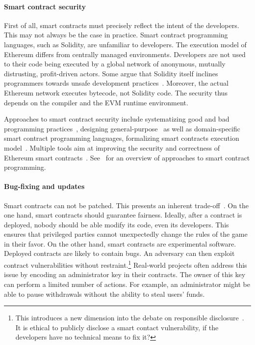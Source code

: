 \paragraph{Smart contract security}
First of all, smart contracts must precisely reflect the intent of the developers.
This may not always be the case in practice.
Smart contract programming languages, such as Solidity, are unfamiliar to developers.
The execution model of Ethereum differs from centrally managed environments.
Developers are not used to their code being executed by a global network of anonymous, mutually distrusting, profit-driven actors.
Some argue that Solidity itself inclines programmers towards unsafe development practices~\cite{ydtm2016}.
Moreover, the actual Ethereum network executes bytecode, not Solidity code.
The security thus depends on the compiler and the EVM runtime environment.

Approaches to smart contract security include systematizing good and bad programming practices~\cite{ConsenSys16, Chen2017}, designing general-purpose~\cite{Hirai2017a, Buterin2017b, Pettersson2016} as well as domain-specific~\cite{EgelundMueller2017} smart contract programming languages, formalizing smart contracts execution model~\cite{Sergey2017}.
Multiple tools aim at improving the security and correctness of Ethereum smart contracts~\cite{Bhargavan2016, Luu2016, Hirai2017, Hildenbrandt2018, Tsankov2018, Jiang2018, Slither, Manticore, Mythril, Echidna}.
See~\cite{Seijas2016} for an overview of approaches to smart contract programming.

\paragraph{Bug-fixing and updates}
Smart contracts can not be patched.
This presents an inherent trade-off~\cite{Porru2017}.
On the one hand, smart contracts should guarantee fairness.
Ideally, after a contract is deployed, nobody should be able modify its code, even its developers.
This ensures that privileged parties cannot unexpectedly change the rules of the game in their favor.
On the other hand, smart contracts are experimental software.
Deployed contracts are likely to contain bugs.
An adversary can then exploit contract vulnerabilities without restraint.\footnote{This introduces a new dimension into the debate on responsible disclosure~\cite{Schneier2007}. It is ethical to publicly disclose a smart contact vulnerability, if the developers have no technical means to fix it?}
Real-world projects often address this issue by encoding an administrator key in their contracts.
The owner of this key can perform a limited number of actions.
For example, an administrator might be able to pause withdrawals without the ability to steal users' funds.


